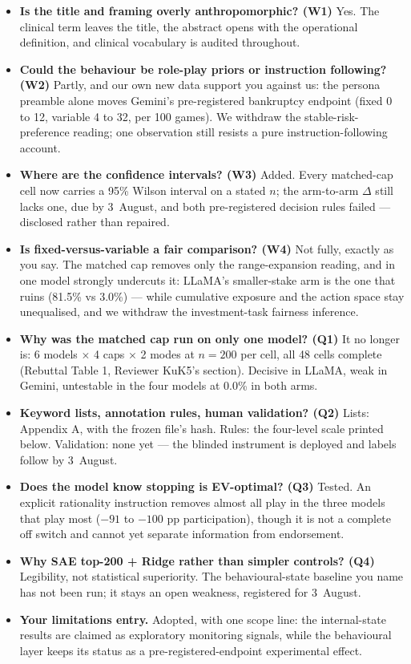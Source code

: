 \begin{itemize}
\item \textbf{Is the title and framing overly anthropomorphic? (W1)} Yes. The clinical term
leaves the title, the abstract opens with the operational definition, and clinical vocabulary is
audited throughout.
\item \textbf{Could the behaviour be role-play priors or instruction following? (W2)} Partly,
and our own new data support you against us: the persona preamble alone moves Gemini's
pre-registered bankruptcy endpoint (fixed 0 to 12, variable 4 to 32, per 100 games). We
withdraw the stable-risk-preference reading; one observation still resists a pure
instruction-following account.
\item \textbf{Where are the confidence intervals? (W3)} Added. Every matched-cap cell now
carries a 95\% Wilson interval on a stated $n$; the arm-to-arm $\Delta$ still lacks one, due by
3~August, and both pre-registered decision rules failed --- disclosed rather than repaired.
\item \textbf{Is fixed-versus-variable a fair comparison? (W4)} Not fully, exactly as you say.
The matched cap removes only the range-expansion reading, and in one model strongly undercuts it: LLaMA's
smaller-stake arm is the one that ruins (81.5\% vs 3.0\%) --- while cumulative exposure and the
action space stay unequalised, and we withdraw the investment-task fairness inference.
\item \textbf{Why was the matched cap run on only one model? (Q1)} It no longer is: 6 models
$\times$ 4 caps $\times$ 2 modes at $n = 200$ per cell, all 48 cells complete (Rebuttal Table 1,
Reviewer KuK5's section). Decisive in LLaMA, weak in Gemini, untestable in the four models at
0.0\% in both arms.
\item \textbf{Keyword lists, annotation rules, human validation? (Q2)} Lists: Appendix A, with
the frozen file's hash. Rules: the four-level scale printed below. Validation: none yet --- the
blinded instrument is deployed and labels follow by 3~August.
\item \textbf{Does the model know stopping is EV-optimal? (Q3)} Tested. An explicit rationality
instruction removes almost all play in the three models that play most ($-91$ to $-100$ pp
participation), though it is not a complete off switch and cannot yet separate information from
endorsement.
\item \textbf{Why SAE top-200 + Ridge rather than simpler controls? (Q4)} Legibility, not
statistical superiority. The behavioural-state baseline you name has not been run; it stays an
open weakness, registered for 3~August.
\item \textbf{Your limitations entry.} Adopted, with one scope line: the internal-state results
are claimed as exploratory monitoring signals, while the behavioural layer keeps its status as a
pre-registered-endpoint experimental effect.
\end{itemize}

